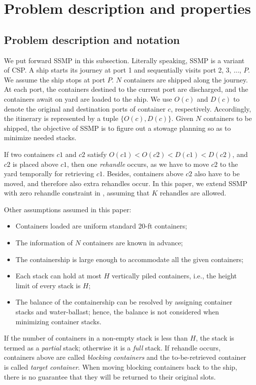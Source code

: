 \documentclass[review,3p,times,authoryear,12pt]{elsarticle}
\begin{document}
\section{Problem description and properties}
\label{sec:pd}
\subsection{Problem description and notation}
We put forward SSMP in this subsection.
Literally speaking, SSMP is a variant of CSP.
A ship starts its journey at port 1 and sequentially visits port 2, 3, ..., $P$. We assume the ship stops at port $P$.
$N$ containers are shipped along the journey.
At each port, the containers destined to the current port are discharged, and the containers await on yard are loaded to the ship.
We use $O(c)$ and $D(c)$ to denote the original and destination ports of container $c$, respectively. Accordingly, the itinerary is represented by a tuple $\{O(c), D(c)\}$.
Given $N$ containers to be shipped, the objective of SSMP is to figure out a stowage planning so as to minimize needed stacks.

If two containers $c1$ and $c2$ satisfy $O(c1)<O(c2)<D(c1)<D(c2)$, and $c2$ is placed above $c1$, then one \textit{rehandle} occurs, as we have to move $c2$ to the yard temporally for retrieving $c1$. Besides, containers above $c2$ also have to be moved, and therefore also extra rehandles occur.
In this paper, we extend SSMP with zero rehandle constraint in \cite{wang2014stowage}, assuming that $K$ rehandles are allowed.

Other assumptions assumed in this paper:
\begin{itemize}
\item Containers loaded are uniform standard 20-ft containers;
\item The information of $N$ containers are known in advance;
\item The containership is large enough to accommodate all the given containers;
\item Each stack can hold at most $H$ vertically piled containers, i.e., the height limit of every stack is $H$;
\item The balance of the containership can be resolved by assigning container stacks and water-ballast; hence, the balance is not considered when minimizing container stacks.
\end{itemize}

If the number of containers in a non-empty stack is less than $H$, the stack is termed as a \textit{partial} stack; otherwise it is a \textit{full} stack.
If rehandle occurs, containers above are called \textit{blocking containers} and the to-be-retrieved container is called \textit{target container}.
When moving blocking containers back to the ship, there is no guarantee that they will be returned to their original slots.
\end{document}
